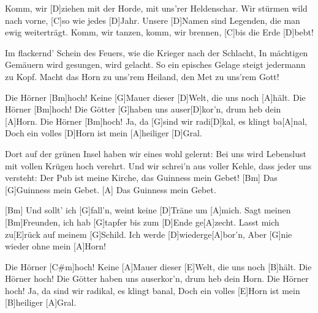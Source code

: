 

\begin{guitar}
	Komm, wir [D]ziehen mit der Horde, mit uns'rer Heldenschar.
	Wir stürmen wild nach vorne, [C]so wie jedes [D]Jahr.
	Unsere [D]Namen sind Legenden, die man ewig weiterträgt.
	Komm, wir tanzen, komm, wir brennen, [C]bis die Erde [D]bebt!
	
	Im flackernd' Schein des Feuers, wie die Krieger nach der Schlacht,
	In mächtigen Gemäuern wird gesungen, wird gelacht.
	So ein episches Gelage steigt jedermann zu Kopf.
	Macht das Horn zu uns'rem Heiland, den Met zu uns'rem Gott!
	
	Die Hörner [Bm]hoch! Keine [G]Mauer dieser [D]Welt, die uns noch [A]hält.
	Die Hörner [Bm]hoch! Die Götter [G]haben uns auser[D]kor'n, drum heb dein [A]Horn.
	Die Hörner [Bm]hoch! Ja, da [G]sind wir radi[D]kal, es klingt ba[A]nal,
	Doch ein volles [D]Horn ist mein [A]heiliger [D]Gral.
	
	Dort auf der grünen Insel haben wir eines wohl gelernt:
	Bei uns wird Lebenslust mit vollen Krügen hoch verehrt.
	Und wir schrei'n aus voller Kehle, dass jeder uns versteht:
	Der Pub ist meine Kirche, das Guinness mein Gebet!
	[Bm] Das [G]Guinness mein Gebet.
	[A] Das Guinness mein Gebet.
	
	 
	
	[Bm] Und sollt' ich [G]fall'n, weint keine [D]Träne um [A]mich.
	Sagt meinen [Bm]Freunden, ich hab [G]tapfer bis zum [D]Ende ge[A]zecht.
	Lasst mich zu[E]rück auf meinem [G]Schild.
	Ich werde [D]wiederge[A]bor'n,
	Aber [G]nie wieder ohne mein [A]Horn!
	
	Die Hörner [C#m]hoch!
	Keine [A]Mauer dieser [E]Welt, die uns noch [B]hält.
	Die Hörner hoch!
	Die Götter haben uns auserkor'n, drum heb dein Horn.
	Die Hörner hoch!
	Ja, da sind wir radikal, es klingt banal,
	Doch ein volles [E]Horn ist mein [B]heiliger [A]Gral.
\end{guitar}